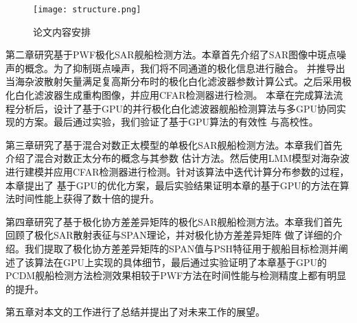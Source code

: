   \begin{figure}[H] %
    \centering
    \texttt{[image: structure.png]}
    \caption{论文内容安排}
    \label{fig:chap1:structure}
  \end{figure}

  第二章研究基于PWF极化SAR舰船检测方法。本章首先介绍了SAR图像中斑点噪声的概念。为了抑制斑点噪声，我们将不同通道的极化信息进行融合。
  并推导出当海杂波散射矢量满足复高斯分布时的极化白化滤波器参数计算公式。之后采用极化白化滤波器生成重构图像，并应用CFAR检测器进行检测。
  本章在完成算法流程分析后，设计了基于GPU的并行极化白化滤波器舰船检测算法与多GPU协同实现的方案。最后通过实验，我们验证了基于GPU算法的有效性
  与高校性。

  第三章研究了基于混合对数正太模型的单极化SAR舰船检测方法。本章我们首先介绍了混合对数正太分布的概念与其参数
  估计方法。然后使用LMM模型对海杂波进行建模并应用CFAR检测器进行检测。针对该算法中迭代计算分布参数的过程，本章提出了
  基于GPU的优化方案，最后实验结果证明本章的基于GPU的方法在算法时间性能上获得了数十倍的提升。

  第四章研究了基于极化协方差差异矩阵的极化SAR舰船检测方法。本章我们首先回顾了极化SAR散射表征与SPAN理论，并对极化协方差差异矩阵
  做了详细的介绍。我们提取了极化协方差差异矩阵的SPAN值与PSH特征用于舰船目标检测并阐述了该算法在GPU上实现的具体细节，最后通过实验证明了本章基于GPU的
  PCDM舰船检测方法检测效果相较于PWF方法在时间性能与检测精度上都有明显的提升。

  第五章对本文的工作进行了总结并提出了对未来工作的展望。
